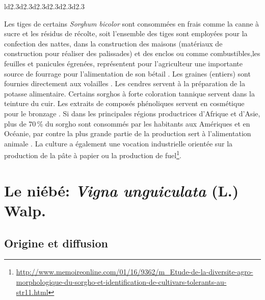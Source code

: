 \documentclass[a4paper,11pt]{article}
\begin{document}
\begin{table}
\begin{footnotesize}
\begin{center}
\begin{tabular}{ld{2.3}d{2.3}d{2.3}d{2.3}d{2.3}d{2.3}}
      \end{tabular}
      \caption{Situations africaines et mondiale de production du
        sorgho, selon l'USDA (\emph{United States Department of
          Agriculture}) avec la production réelle (2015-2016) et les
        estimations
        (2016-2017)\protect\footnote{\protect\url{http://www.commodafrica.com/14-11-2016-la-production-de-sorgho-en-afrique-progresserait-de-23-en-201617}}.}
      \label{tab:USDA_global_sorgho_production}
    \end{center}
  \end{footnotesize}
\end{table}


Les tiges de certains \emph{Sorghum bicolor} sont consommées en frais
comme la canne à sucre et les résidus de récolte, soit l'ensemble des
tiges sont employées pour la confection des nattes, dans la
construction des maisons (matériaux de construction pour réaliser des
palissades) et des enclos ou comme combustibles,les feuilles et
panicules égrenées, représentent pour l'agriculteur une importante
source de fourrage pour l'alimentation de son bétail
\cite{Chantereau_1991}. Les graines (entiers) sont fournies
directement aux volailles \cite{SaintClair_1989}. Les cendres servent
à la préparation de la potasse alimentaire. Certains sorghos à forte
coloration tannique servent dans la teinture du cuir. Les extraits de
composés phénoliques servent en cosmétique pour le bronzage
\cite{BARRO_KONDOMBO_2010}. Si dans les principales régions
productrices d'Afrique et d'Asie, plus de 70\,\% du sorgho sont
consommés par les habitants aux Amériques et en Océanie, par contre la
plus grande partie de la production sert à l'alimentation animale
\cite{BARRO_KONDOMBO_2010}. La culture a également une vocation
industrielle orientée sur la production de la pâte à papier ou la
production de
fuel\footnote{\url{http://www.memoireonline.com/01/16/9362/m_Etude-de-la-diversite-agro-morphologique-du-sorgho-et-identification-de-cultivars-tolerants-au-str11.html}}.


\section{Le niébé: \emph{Vigna unguiculata} (L.) Walp.}

\subsection{Origine et diffusion}
\end{document}
